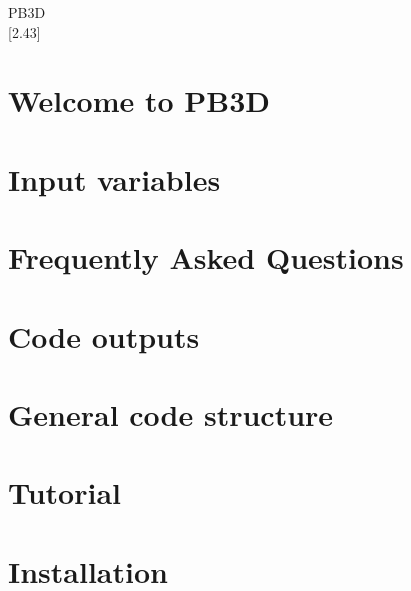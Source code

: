 \let\mypdfximage\pdfximage\def\pdfximage{\immediate\mypdfximage}\documentclass[twoside]{book}
\newcommand{\+}{\discretionary{\mbox{\scriptsize$\hookleftarrow$}}{}{}}
\newcommand{\clearemptydoublepage}{%
  \newpage{\pagestyle{empty}\cleardoublepage}%
}
\begin{document}
\hypersetup{pageanchor=false,
             bookmarksnumbered=true,
             pdfencoding=unicode
            }
\begin{titlepage}
\vspace*{7cm}
\begin{center}%
{\color{stylecolor} \TitleFont\fontsize{72}{80} \selectfont P\+B3D \\}
\vspace*{1cm}
{\large \mbox{[}2.\+43\mbox{]} }\\
\vspace*{1cm}
\end{center}
\end{titlepage}
\clearemptydoublepage
{}
\tableofcontents
\clearemptydoublepage
{}
\hypersetup{pageanchor=true}

\chapter{Welcome to P\+B3D}
\label{index}\hypertarget{index}{}
\chapter{Input variables}
\label{page_inputs}

\chapter{Frequently Asked Questions}
\label{page_faq}

\chapter{Code outputs}
\label{page_outputs}

\chapter{General code structure}
\label{page_overview}

\chapter{Tutorial}
\label{page_tutorial}

\chapter{Installation}
\label{page_installation}

\end{document}
